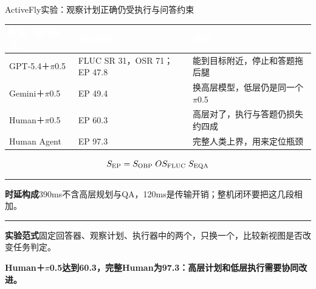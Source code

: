 \documentclass[aspectratio=169,10pt]{beamer}
\def\slidesource{}
\newcommand{\takeaway}[1]{\par\begin{takebox}\fontsize{9.1}{11.5}\selectfont\bfseries\color{navy}#1\end{takebox}}
\newcommand{\ph}[1]{{\color{teal}\rule[-0.35mm]{0.8mm}{3.1mm}}\hspace{1.1mm}\textbf{\color{navy}#1}}
\newcommand{\thd}[1]{\textcolor{white}{\bfseries #1}}
\begin{document}
\begin{frame}[t,label=activefly]{ActiveFly实验：观察计划正确仍受执行与问答约束}
\relax
{\fontsize{8.7}{11.1}\selectfont
{}
\begin{tabularx}{\linewidth}{@{}Y{0.69}Y{1.29}Y{1.02}@{}}\toprule
{}\thd{配置（每行独立）} & \thd{论文报告（\%）} & \thd{说明}\\\midrule
GPT-5.4＋\ensuremath{\pi}0.5 & FLUC SR 31，OSR 71；EP 47.8 & 能到目标附近，停止和答题拖后腿\\
Gemini＋\ensuremath{\pi}0.5 & EP 49.4 & 换高层模型，低层仍是同一个\ensuremath{\pi}0.5\\
Human＋\ensuremath{\pi}0.5 & EP 60.3 & 高层对了，执行与答题仍损失约四成\\
Human Agent & EP 97.3 & 完整人类上界，用来定位瓶颈\\
\bottomrule\end{tabularx}\par}
\[S_{\rm EP}=S_{\rm OBP}\;OS_{\rm FLUC}\;S_{\rm EQA}\]\par\ph{时延构成}\quad 390ms不含高层规划与QA，120ms是传输开销；整机闭环要把这几段相加。\par\vspace{1mm}
\par\ph{实验范式}\quad 固定回答器、观察计划、执行器中的两个，只换一个，比较新视图是否改变任务判定。\par\vspace{1mm}
\takeaway{Human＋\ensuremath{\pi}0.5达到60.3，完整Human为97.3：高层计划和低层执行需要协同改进。}

\end{frame}
\gdef\slidesource{原文依据：\href{https://arxiv.org/html/2601.07558v1}{[14] FlyCo}}
\end{document}
